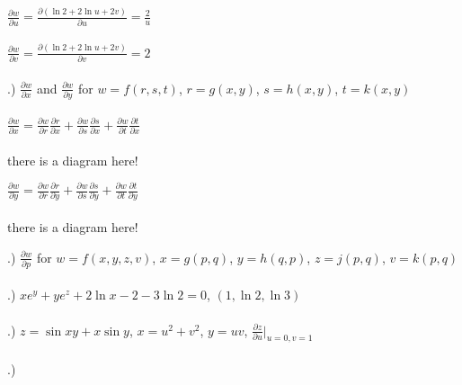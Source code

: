 \documentclass[12pt]{article}
\begin{document}
\noindent $\frac{\partial w}{\partial u} = \frac{\partial (\ln{2} + 2\ln{u} + 2v)}{\partial u} = \frac{2}{u}$\\\\

\noindent $\frac{\partial w}{\partial v} = \frac{\partial (\ln{2} + 2\ln{u} + 2v)}{\partial v} = 2$\\\\


.) $\frac{\partial w}{\partial x}$ and $\frac{\partial w}{\partial y}$ for $w = f(r,s,t)$, \hspace{10pt} $r = g(x,y)$, \hspace{10pt} $s = h(x,y)$, \hspace{10pt} $t = k(x,y)$\\\\

\noindent $\frac{\partial w}{\partial x} = \frac{\partial w}{\partial r}\frac{\partial r}{\partial x} + \frac{\partial w}{\partial s}\frac{\partial s}{\partial x} + \frac{\partial w}{\partial t}\frac{\partial t}{\partial x}$ \\\\
there is a diagram here!

\noindent $\frac{\partial w}{\partial y} = \frac{\partial w}{\partial r}\frac{\partial r}{\partial y} + \frac{\partial w}{\partial s}\frac{\partial s}{\partial y} + \frac{\partial w}{\partial t}\frac{\partial t}{\partial y}$ \\\\
there is a diagram here!



.) $\frac{\partial w}{\partial p}$ for $w = f(x,y,z,v)$, \hspace{10pt} $x = g(p,q)$, \hspace{10pt} $y = h(q,p)$, \hspace{10pt} $z = j(p,q)$, \hspace{10pt} $v = k(p,q)$\\\\
.) $xe^{y} + ye^{z} + 2\ln{x}-2 -3\ln{2} = 0$, \hspace{10pt} $(1, \ln{2}, \ln{3})$\\\\
.)  \hspace{10pt}$z = \sin{xy} + x\sin{y}$, \hspace{10pt} $x = u^{2} + v^{2}$, \hspace{10pt} $y = uv$, \hspace{10pt} $\frac{\partial z}{\partial u} \Big|_{u = 0, v=1}$\\\\
.) 
\end{document}
